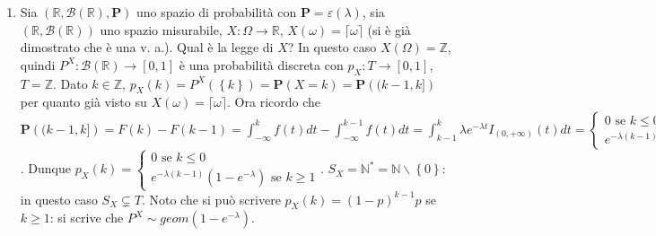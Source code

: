 \documentclass{article}
\begin{document}
\begin{enumerate}
\item Sia $\left( 
\mathbb{R}
,\mathcal{B}\left( 
\mathbb{R}
\right) ,\mathbf{P}\right) $ uno spazio di probabilit\`{a} con $\mathbf{P}%
=\varepsilon \left( \lambda \right) $, sia $\left( 
\mathbb{R}
,\mathcal{B}\left( 
\mathbb{R}
\right) \right) $ uno spazio misurabile, $X:\Omega \rightarrow 
\mathbb{R}
$, $X\left( \omega \right) =\lceil \omega \rceil $ (si \`{e} gi\`{a}
dimostrato che \`{e} una v. a.). Qual \`{e} la legge di $X$? In questo caso $%
X\left( \Omega \right) =%
\mathbb{Z}
$, quindi $P^{X}:\mathcal{B}\left( 
\mathbb{R}
\right) \rightarrow \left[ 0,1\right] $ \`{e} una probabilit\`{a} discreta
con $p_{X}:T\rightarrow \left[ 0,1\right] $, $T=%
\mathbb{Z}
$. Dato $k\in 
\mathbb{Z}
$, $p_{X}\left( k\right) =P^{X}\left( \left\{ k\right\} \right) =\mathbf{P}%
\left( X=k\right) =\mathbf{P}\left( (k-1,k]\right) $ per quanto gi\`{a}
visto su $X\left( \omega \right) =\lceil \omega \rceil $. Ora ricordo che $%
\mathbf{P}\left( (k-1,k]\right) =F\left( k\right) -F\left( k-1\right)
=\int_{-\infty }^{k}f\left( t\right) dt-\int_{-\infty }^{k-1}f\left(
t\right) dt=\int_{k-1}^{k}\lambda e^{-\lambda t}I_{\left( 0,+\infty \right)
}\left( t\right) dt=\left\{ 
\begin{array}{c}
0\text{ se }k\leq 0 \\ 
e^{-\lambda \left( k-1\right) }-e^{-\lambda k}\text{ se }k\geq 1%
\end{array}%
\right. $. Dunque $p_{X}\left( k\right) =\left\{ 
\begin{array}{c}
0\text{ se }k\leq 0 \\ 
e^{-\lambda \left( k-1\right) }\left( 1-e^{-\lambda }\right) \text{ se }%
k\geq 1%
\end{array}%
\right. $. $S_{X}=%
\mathbb{N}
^{\ast }=%
\mathbb{N}
\backslash \left\{ 0\right\} $: in questo caso $S_{X}\varsubsetneq T$. Noto
che si pu\`{o} scrivere $p_{X}\left( k\right) =\left( 1-p\right) ^{k-1}p$ se 
$k\geq 1$: si scrive che $P^{X}\sim geom\left( 1-e^{-\lambda }\right) $.


\end{enumerate}
\end{document}
